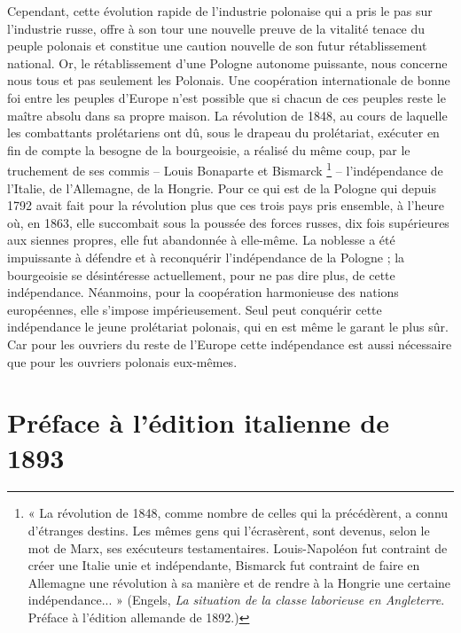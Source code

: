 \documentclass[french,twoside]{book} %
\newcommand{\byline}[1]{\bigskip{\RaggedLeft{#1}\par}\bigskip}
\begin{document}
Cependant, cette évolution rapide de l’industrie polonaise qui a pris le pas sur l’industrie russe, offre à son tour une nouvelle preuve de la vitalité tenace du peuple polonais et constitue une caution nouvelle de son futur rétablissement national. Or, le rétablissement d’une Pologne autonome puissante, nous concerne nous tous et pas seulement les Polonais. Une coopération internationale de bonne foi entre les peuples d’Europe n’est possible que si chacun de ces peuples reste le maître absolu dans sa propre maison. La révolution de 1848, au cours de laquelle les combattants prolétariens ont dû, sous le drapeau du prolétariat, exécuter en fin de compte la besogne de la bourgeoisie, a réalisé du même coup, par le truchement de ses commis – Louis Bonaparte et Bismarck \footnote{« La révolution de 1848, comme nombre de celles qui la précédèrent, a connu d’étranges destins. Les mêmes gens qui l’écrasèrent, sont devenus, selon le mot de Marx, ses exécuteurs testamentaires. Louis-Napoléon fut contraint de créer une Italie unie et indépendante, Bismarck fut contraint de faire en Allemagne une révolution à sa manière et de rendre à la Hongrie une certaine indépendance... » (Engels, \emph{La situation de la classe laborieuse en Angleterre}. Préface à l’édition allemande de 1892.)} – l’indépendance de l’Italie, de l’Allemagne, de la Hongrie. Pour ce qui est de la Pologne qui depuis 1792 avait fait pour la révolution plus que ces trois pays pris ensemble, à l’heure où, en 1863, elle succombait sous la poussée des forces russes, dix fois supérieures aux siennes propres, elle fut abandonnée à elle-même. La noblesse a été impuissante à défendre et à reconquérir l’indépendance de la Pologne ; la bourgeoisie se désintéresse actuellement, pour ne pas dire plus, de cette indépendance. Néanmoins, pour la coopération harmonieuse des nations européennes, elle s’impose impérieusement. Seul peut conquérir cette indépendance le jeune prolétariat polonais, qui en est même le garant le plus sûr. Car pour les ouvriers du reste de l’Europe cette indépendance est aussi nécessaire que pour les ouvriers polonais eux-mêmes.\par

\byline{Friedrich Engels ; \\
Londres, 10 février 1892}
\section[Préface à l’édition italienne de 1893]{Préface à l’édition italienne de 1893}
\end{document}
